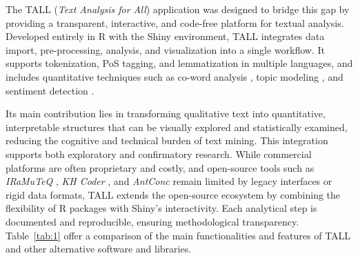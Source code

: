 \documentclass[preprint,12pt,a4paper]{elsarticle}
\begin{document}
The TALL (\textit{Text Analysis for All}) application was designed to bridge this gap by providing a transparent, interactive, and code-free platform for textual analysis. Developed entirely in \textsf{R} with the Shiny environment, TALL integrates data import, pre-processing, analysis, and visualization into a single workflow. It supports tokenization, PoS tagging, and lemmatization in multiple languages, and includes quantitative techniques such as co-word analysis \cite{for16,ari22}, topic modeling \cite{mis20}, and sentiment detection \cite{tab11}.

Its main contribution lies in transforming qualitative text into quantitative, interpretable structures that can be visually explored and statistically examined, reducing the cognitive and technical burden of text mining. This integration supports both exploratory and confirmatory research. While commercial platforms are often proprietary and costly, and open-source tools such as \textit{IRaMuTeQ} \cite{rat14}, \textit{KH Coder} \cite{hig17}, and \textit{AntConc} \cite{ant24} remain limited by legacy interfaces or rigid data formats, TALL extends the open-source ecosystem by combining the flexibility of \textsf{R} packages with Shiny's interactivity. Each analytical step is documented and reproducible, ensuring methodological transparency. Table~\ref{tab:1} offer a comparison of the main functionalities and features of TALL and other alternative software and libraries.
\end{document}
